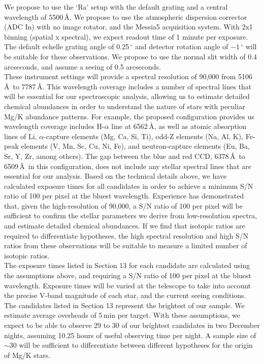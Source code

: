 \documentclass{article}
\begin{document}
\begin{technicalinfo}
We propose to use the `Ra' setup with the default grating and a central wavelength of 5500\,\AA. We propose to use the atmospheric dispersion corrector (ADC In) with no image rotator, and the Messia5 acquisition system. With 2x1 binning (spatial x spectral), we expect readout time of 1 minute per exposure. The default echelle grating angle of 0.25\,$^\circ$ and detector rotation angle of $-1$\,$^\circ$ will be suitable for these observations. We propose to use the normal slit width of 0.4 arcseconds, and assume a seeing of 0.5 arcseconds.\\
 
These instrument settings will provide a spectral resolution of 90,000 from 5106\,\AA\ to 7787\,\AA. This wavelength coverage includes a number of spectral lines that will be essential for our spectroscopic analysis, allowing us to estimate detailed chemical abundances in order to understand the nature of stars with peculiar Mg/K abundance patterns. For example, the proposed configuration provides us wavelength coverage includes H-$\alpha$ line at 6562\,\AA, as well as atomic absorption lines of Li, $\alpha$-capture elements (Mg, Ca, Si, Ti), odd-Z elements (Na, Al, K), Fe-peak elements (V, Mn, Sc, Cu, Ni, Fe), and neutron-capture elements (Eu, Ba, Sr, Y, Zr, among others). The gap between the blue and red CCD, 6378\,\AA\ to 6509\,\AA\ in this configuration, does not include any stellar spectral lines that are essential for our analysis. Based on the technical details above, we have calculated exposure times for all candidates in order to achieve a minimum S/N ratio of 100 per pixel at the bluest wavelength. Experience has demonstrated that, given the high-resolution of 90,000, a S/N ratio of 100 per pixel will be sufficient to confirm the stellar parameters we derive from low-resolution spectra, and estimate detailed chemical abundances. If we find that isotopic ratios are required to differentiate hypotheses, the high spectral resolution and high  S/N ratios from these  observations will be  suitable to measure a limited number of isotopic ratios.\\

The exposure times listed in Section 13 for each candidate are calculated using the assumptions above, and requiring a S/N ratio of 100 per pixel at  the bluest wavelength. Exposure times will be varied at the telescope to take into account the precise V-band magnitude of each star, and the current seeing conditions. The candidates listed in Section 13 represent the brightest of our sample. We estimate average overheads of 5\,min per target. With these assumptions, we expect to be able to observe 29 to 30 of our brightest candidates in two December nights, assuming 10.25 hours of useful observing time per night. A sample size of $\sim$30 will be sufficient to differentiate between different hypotheses for the origin of Mg/K stars.\\


\end{technicalinfo}
\end{document}
